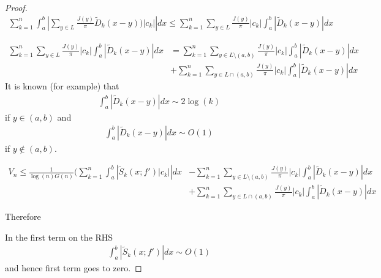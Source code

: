 \documentclass{amsart}
\theoremstyle{definition}
\theoremstyle{remark}
\numberwithin{equation}{section}
\begin{document}
\begin{proof}
\begin{equation}
\begin{aligned}
\sum_{k=1}^{n}\int_a^b\left|\sum_{y\in L}\frac{J(y)}{\pi}\tilde{D}_k(x-y))\left|c_k\right| \right|dx \leq \sum_{k=1}^{n}\sum_{y\in L}\frac{J(y)}{\pi}\left|c_k\right|\int_a^b\left|\tilde{D}_k(x-y)\right|dx
\end{aligned}
\end{equation}
	
\begin{equation}\begin{aligned}
\sum_{k=1}^{n}\sum_{y\in L}\frac{J(y)}{\pi}\left|c_k\right|\int_a^b\left|\tilde{D}_k(x-y)\right|dx &= \sum_{k=1}^{n}\sum_{y\in L\setminus(a,b)}\frac{J(y)}{\pi}\left|c_k\right|\int_a^b\left|\tilde{D}_k(x-y)\right|dx \\ &+  
    \sum_{k=1}^{n}\sum_{y\in L\cap(a,b)}\frac{J(y)}{\pi}\left|c_k\right|\int_a^b\left|\tilde{D}_k(x-y)\right|dx
\end{aligned}\end{equation}
It is known (for example\cite{article_1345440}) that	
\begin{equation}
\begin{aligned}
\int_a^b\left|\tilde{D}_k(x-y)\right|dx \sim 2\log(k)
\end{aligned}
\end{equation}
 if $y \in (a,b)$ and 
 \begin{equation}\begin{aligned}
 \int_a^b\left|\tilde{D}_k(x-y)\right|dx \sim O(1)
 \end{aligned}\end{equation}
 if $y \notin (a,b)$.
	
\begin{equation}\begin{aligned}
V_n \leq \frac{1}{\log(n)G(n)}(\sum_{k=1}^{n}\int_a^b\left|\tilde{S}_k(x;f')\left|c_k\right|\right|dx &-\sum_{k=1}^{n}\sum_{y\in L\setminus(a,b)}\frac{J(y)}{\pi}\left|c_k\right|\int_a^b\left|\tilde{D}_k(x-y)\right|dx\\
 &+ \sum_{k=1}^{n}\sum_{y\in L\cap(a,b)}\frac{J(y)}{\pi}\left|c_k\right|\int_a^b\left|\tilde{D}_k(x-y)\right|dx
\end{aligned}\end{equation}
	
	
Therefore 

In the first term on the RHS  
\begin{equation}\begin{aligned}
\int_a^b\left|\tilde{S}_k(x;f')\right|dx \sim O(1)
\end{aligned}\end{equation} 
and hence first term goes to zero.


\end{proof}
\end{document}
